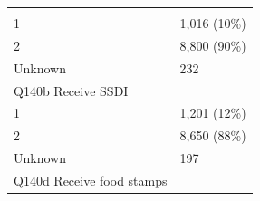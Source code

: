 \documentclass[]{article}
\begin{document}
\begin{longtable}[]{@{}ll@{}}
\begin{minipage}[t]{0.23\columnwidth}
\strut
\end{minipage}\tabularnewline
\begin{minipage}[t]{0.71\columnwidth}\raggedright
1\strut
\end{minipage} & \begin{minipage}[t]{0.23\columnwidth}\raggedright
1,016 (10\%)\strut
\end{minipage}\tabularnewline
\begin{minipage}[t]{0.71\columnwidth}\raggedright
2\strut
\end{minipage} & \begin{minipage}[t]{0.23\columnwidth}\raggedright
8,800 (90\%)\strut
\end{minipage}\tabularnewline
\begin{minipage}[t]{0.71\columnwidth}\raggedright
Unknown\strut
\end{minipage} & \begin{minipage}[t]{0.23\columnwidth}\raggedright
232\strut
\end{minipage}\tabularnewline
\begin{minipage}[t]{0.71\columnwidth}\raggedright
Q140b Receive SSDI\strut
\end{minipage} & \begin{minipage}[t]{0.23\columnwidth}\raggedright
\strut
\end{minipage}\tabularnewline
\begin{minipage}[t]{0.71\columnwidth}\raggedright
1\strut
\end{minipage} & \begin{minipage}[t]{0.23\columnwidth}\raggedright
1,201 (12\%)\strut
\end{minipage}\tabularnewline
\begin{minipage}[t]{0.71\columnwidth}\raggedright
2\strut
\end{minipage} & \begin{minipage}[t]{0.23\columnwidth}\raggedright
8,650 (88\%)\strut
\end{minipage}\tabularnewline
\begin{minipage}[t]{0.71\columnwidth}\raggedright
Unknown\strut
\end{minipage} & \begin{minipage}[t]{0.23\columnwidth}\raggedright
197\strut
\end{minipage}\tabularnewline
\begin{minipage}[t]{0.71\columnwidth}\raggedright
Q140d Receive food stamps\strut
\end{minipage} & \begin{minipage}[t]{0.23\columnwidth}\raggedright

\end{minipage}
\end{longtable}
\end{document}
